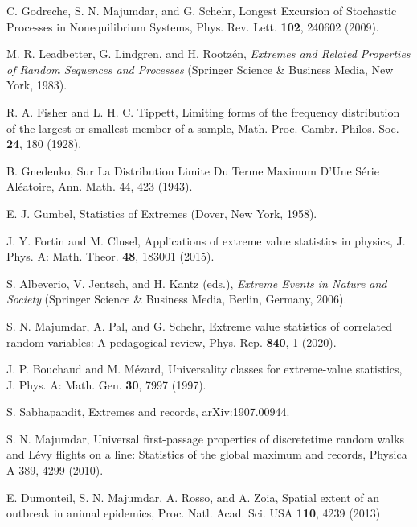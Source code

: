 \documentclass[showpacs,amsmath,amssymb,aps,pre,twocolumn,]{revtex4-1}
\begin{document}
\begin{thebibliography}{}
C. Godreche, S. N. Majumdar, and G. Schehr, Longest Excursion of Stochastic Processes in Nonequilibrium Systems,
Phys. Rev. Lett. \textbf{102}, 240602 (2009).





M. R. Leadbetter, G. Lindgren, and H. Rootz\'{e}n, \textit{Extremes and Related Properties of Random Sequences and Processes} (Springer Science \& Business Media, New York, 1983).


R. A. Fisher and L. H. C. Tippett, Limiting forms of the
frequency distribution of the largest or smallest member of a
sample, Math. Proc. Cambr. Philos. Soc. \textbf{24}, 180 (1928).



B. Gnedenko, Sur La Distribution Limite Du Terme Maximum
D’Une S\'{e}rie Al\'{e}atoire, Ann. Math. 44, 423 (1943).

E. J. Gumbel, Statistics of Extremes (Dover, New York, 1958).



J. Y. Fortin and M. Clusel, Applications of extreme value
statistics in physics, J. Phys. A: Math. Theor. \textbf{48}, 183001
(2015).

S. Albeverio, V. Jentsch, and H. Kantz (eds.), \textit{Extreme Events in Nature and Society} (Springer Science \& Business Media,
Berlin, Germany, 2006).

S. N. Majumdar, A. Pal, and G. Schehr, Extreme value statistics of correlated random variables: A pedagogical review,
Phys. Rep. \textbf{840}, 1 (2020).

J. P. Bouchaud and M. M\'{e}zard, Universality classes for
extreme-value statistics, J. Phys. A: Math. Gen. \textbf{30}, 7997
(1997).

S. Sabhapandit, Extremes and records, arXiv:1907.00944.

S. N. Majumdar, Universal first-passage properties of discretetime random walks and L\'{e}vy flights on a line: Statistics of the
global maximum and records, Physica A 389, 4299 (2010).



 E. Dumonteil, S. N. Majumdar, A. Rosso, and A. Zoia, Spatial
extent of an outbreak in animal epidemics, Proc. Natl. Acad.
Sci. USA \textbf{110}, 4239 (2013)


\end{thebibliography}
\end{document}
